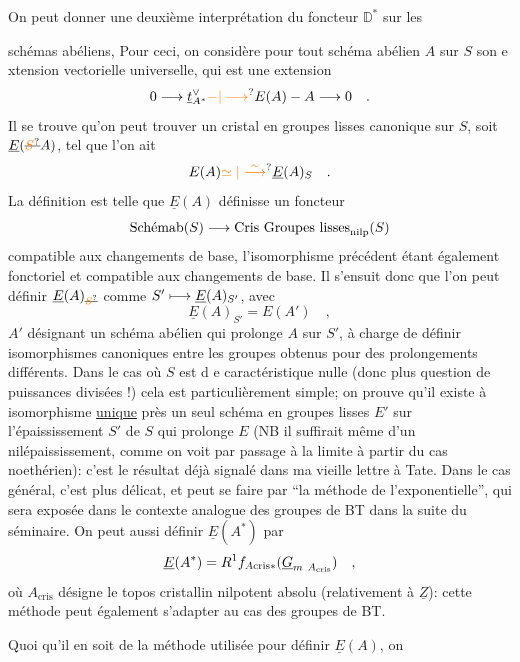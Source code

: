  On peut donner une deuxième interprétation du foncteur $\mathbb{D}^*$ sur les

schémas abéliens,  Pour ceci, on considère pour tout schéma abélien $A$ sur $S$ son e xtension vectorielle universelle, qui est une extension
\[
0\handwritten{\longrightarrow}\underline{t}_{A^*}^{\handwritten{\vee}}\handwritten{\unsure{\mathbin{-}|\longrightarrow}}E(A)\handwritten{\mathbin{-}}A\handwritten{\longrightarrow}0\quad .
\]
Il se trouve qu'on peut trouver un cristal en groupes lisses canonique sur $S$, soit $\underline{E}(\deleted{\unsure{S}}A)$, tel que l'on ait
\[
E(A)\handwritten{\unsure{\simeq|\overset{\sim}{\longrightarrow}}}\underline{E}(A)_S\quad .
\]
La définition est telle que  $\underline{E}(A)$ définisse un foncteur
\[
\text{Schémab}(S)\longrightarrow\text{Cris Groupes lisses}_{\mathrm{nilp}}(S)
\]
compatible aux changements de base, l'isomorphisme précédent étant également fonctoriel et compatible aux changements de base. Il s'ensuit donc que l'on peut définir $\underline{E}(A)_{\deleted{\unsure{S}}}$ comme $S'\longmapsto\underline{E}(A)_{S'}$, avec
\[
\underline{E}(A)_{S'}=E(A')\quad,
\]
$A'$ désignant un schéma abélien qui prolonge $A$ sur $S'$,  à charge de définir isomorphismes canoniques entre les groupes obtenus pour des prolongements différents. Dans le cas où $S$ est d e caractéristique nulle (donc plus question de puissances divisées !) cela est particulièrement simple; on prouve qu'il existe à isomorphisme \uline{unique} près un seul schéma en groupes lisses $E'$ sur l'épaississement $S'$ de $S$ qui prolonge $E$ (NB il suffirait même d'un nilépaississement, comme on voit par passage à la limite à partir du cas noethérien): c'est le résultat déjà signalé dans ma vieille lettre à Tate. Dans le cas général, c'est plus délicat, et peut se faire par ``la méthode de l'exponentielle'', qui sera exposée dans le contexte analogue des groupes de BT dans la suite du séminaire. On peut aussi définir $\underline{E}(A^*)$ par
\[
\underline{E}(A^*)\handwritten{=}R^1f_{A\mathrm{cris}*}(\underline{G}_{m\ A_{\mathrm{cris}}})\quad ,
\]
où $A_{\mathrm{cris}}$ désigne le topos cristallin  nilpotent absolu (relativement à $\underline{Z}$): cette méthode peut également s'adapter au cas des groupes de BT.

Quoi qu'il en soit de la méthode utilisée pour définir $\underline{E}(A)$, on
